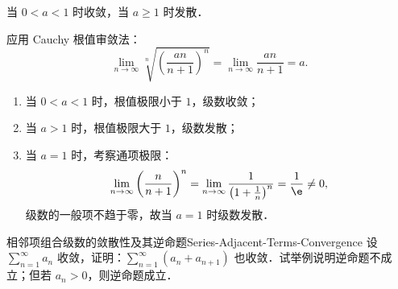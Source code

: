 \begin{solution}
     当 $0 < a < 1$ 时收敛，当 $a \geqslant 1$ 时发散．

    应用 Cauchy 根值审敛法：
    \begin{equation}
        \lim_{n\to\infty} \sqrt[n]{\left(\frac{an}{n+1}\right)^n} = \lim_{n\to\infty} \frac{an}{n+1} = a.
    \end{equation}
    \begin{enumerate}
        \item 当 $0 < a < 1$ 时，根值极限小于 $1$，级数收敛；
        \item 当 $a > 1$ 时，根值极限大于 $1$，级数发散；
        \item 当 $a = 1$ 时，考察通项极限：
              \begin{equation}
                  \lim_{n\to\infty} \left(\frac{n}{n+1}\right)^n = \lim_{n\to\infty} \frac{1}{\left(1 + \frac{1}{n}\right)^n} = \frac{1}{\e} \neq 0,
              \end{equation}
              级数的一般项不趋于零，故当 $a = 1$ 时级数发散．
    \end{enumerate}
\end{solution}

\begin{problem}{相邻项组合级数的敛散性及其逆命题}{Series-Adjacent-Terms-Convergence}
    设 $\sum_{n=1}^\infty a_n$ 收敛，证明：$\sum_{n=1}^\infty (a_n + a_{n+1})$ 也收敛．试举例说明逆命题不成立；但若 $a_n > 0$，则逆命题成立．
\end{problem}

